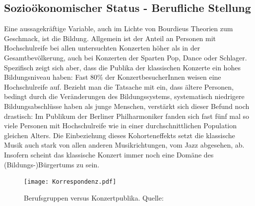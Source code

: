 \documentclass[a4paper, german, oneside]{scrbook}
\begin{document}
\subsection{Sozioökonomischer Status - Berufliche Stellung}
Eine aussagekräftige Variable, auch im Lichte von Bourdieus Theorien zum Geschmack, ist die Bildung. Allgemein ist der Anteil an Personen mit Hochschulreife bei allen untersuchten Konzerten höher als in der Gesamtbevölkerung, auch bei Konzerten der Sparten Pop, Dance oder Schlager. Spezifisch zeigt sich aber, dass die Publika der klassischen Konzerte ein hohes Bildungsniveau haben: Fast 80\% der KonzertbesucherInnen weisen eine Hochschulreife auf. Bezieht man die Tatsache mit ein, dass ältere Personen, bedingt durch die Veränderungen des Bildungssystems, systematisch niedrigere Bildungsabschlüsse haben als junge Menschen, verstärkt sich dieser Befund noch drastisch: Im Publikum der Berliner Philharmoniker fanden sich fast fünf mal so viele Personen mit Hochschulreife wie in einer durchschnittlichen Population gleichen Alters. Die Einbeziehung dieses Kohorteneffekts setzt die klassische Musik auch stark von allen anderen Musikrichtungen, vom Jazz abgesehen, ab. Insofern scheint das klassische Konzert immer noch eine Domäne des (Bildungs-)Bürgertums zu sein. \parencite[vgl.][482]{de_la_motte-haber_konzertpublika_2007}

\begin{figure}[ht]
	\centering
  		\texttt{[image: Korrespondenz.pdf]}
	\caption{Berufsgruppen versus Konzertpublika. Quelle: \cite[487]{de_la_motte-haber_konzertpublika_2007}\protect\footnotemark } %
	\label{korrespondenzgrafik}
\end{figure}

\end{document}

